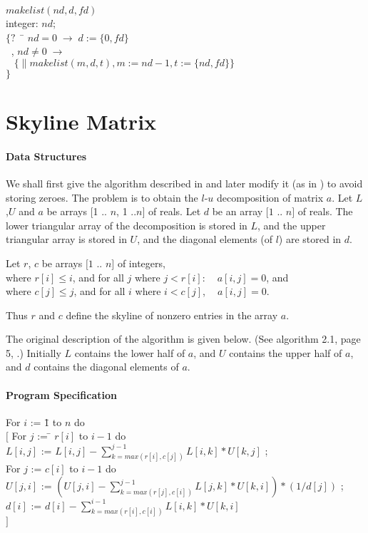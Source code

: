 \begin{tabbing}
$makelist(nd,d,fd)$ \\
integer: $nd$; \\
$\{? \; \;$ \= $nd = 0 \; \rightarrow \; d := \{0,fd\}$ \\
$\;\;$,\> $nd \not = 0 \; \rightarrow \; $\\
        \> $\;\;\; \{\|makelist(m,d,t), m := nd-1, t := \{nd,fd\}\}$ \\
$\}$
\end{tabbing}

\section{Skyline Matrix}
\paragraph{Data Structures}
We shall first give the algorithm described in \cite{Eisenstat} and later
modify it (as in \cite{Eisenstat}) 
to avoid storing zeroes.
The problem is to obtain the $l$-$u$ decomposition of matrix $a$.
Let $L$,$U$ and $a$ be arrays $[$1 .. $n$, 1 ..$n]$ of reals.
Let $d$ be an array $[1$ .. $n]$ of reals.
The lower triangular array of the decomposition is stored in $L$, 
and the upper triangular array 
is stored in $U$, and the diagonal elements (of $l$) are stored in $d$. 

Let $r$, $c$ be arrays $[1 $ .. $n]$ of integers, \\
where $r[i] \leq i$, 
and for all $j$ where $j < r[i]$: $\; \;$ $a[i,j] = 0$, and \\
where $c[j] \leq j$, 
and for all $i$ where $i < c[j]$, $\; \;$ $a[i,j] = 0$.


Thus $r$ and $c$ define the skyline of nonzero entries in the array $a$.

The original description of the algorithm is given below.  (See algorithm 2.1,
page 5, \cite{Eisenstat}.)
Initially $L$ contains the lower half of $a$, and $U$ contains the upper 
half of $a$, and $d$ contains the diagonal elements of $a$.

\paragraph{Program Specification}

\begin{tabbing}
For $i$ := \= 1 to $n$ do \\
          \>  $[$ For $j$ := \= $r[i]$ to $i-1$ do  \\
       \>  \> $L[i,j]$ := $L[i,j] - \sum_{k=max(r[i],c[j])}^{j-1} L[i,k]*U[k,j]$ ; \\
        \>  For $j$ := \> $c[i]$ to $i-1$ do  \\
\> \> $U[j,i]$ := 
$(U[j,i] - \sum_{k=max(r[j],c[i])}^{j-1} L[j,k]*U[k,i])*(1/d[j])$ ; \\
\> $d[i]$ := $d[i] - \sum_{k=max(r[i],c[i])}^{i-1} L[i,k]*U[k,i]$ \\
\> $]$
\end{tabbing}


